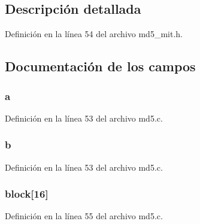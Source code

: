 \subsection{Descripción detallada}


Definición en la línea 54 del archivo md5\+\_\+mit.\+h.



\subsection{Documentación de los campos}
\hypertarget{struct_m_d5___c_t_x_ac5629798efe5fb7cbd33911a77672275}{}
\subsubsection[{a}]{ a}\label{struct_m_d5___c_t_x_ac5629798efe5fb7cbd33911a77672275}


Definición en la línea 53 del archivo md5.\+c.

\hypertarget{struct_m_d5___c_t_x_ae7735a3daa065dc9dfab9dd1a512d557}{}
\subsubsection[{b}]{ b}\label{struct_m_d5___c_t_x_ae7735a3daa065dc9dfab9dd1a512d557}


Definición en la línea 53 del archivo md5.\+c.

\hypertarget{struct_m_d5___c_t_x_ad8cb52dd70ac5316564b1e4b48b0ad7d}{}
\subsubsection[{block}]{ block\mbox{[}16\mbox{]}}\label{struct_m_d5___c_t_x_ad8cb52dd70ac5316564b1e4b48b0ad7d}


Definición en la línea 55 del archivo md5.\+c.

\hypertarget{struct_m_d5___c_t_x_a7dc178b045dfbd504687dc9b0834d1d6}{}
